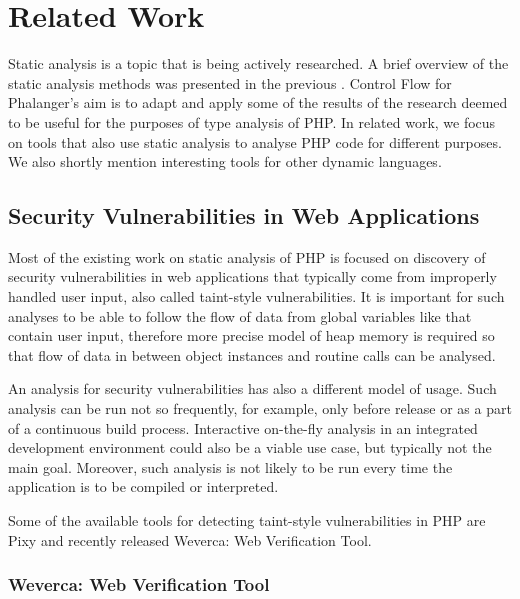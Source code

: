 \chapter{Related Work}

    Static analysis is a topic that is being actively researched. 
    A brief overview of the static analysis methods was presented 
    in the previous \wchapter{}. Control Flow for Phalanger's aim is 
    to adapt and apply some of the results of the research deemed 
    to be useful for the purposes of type analysis of PHP. 
    In related work, we focus on tools that also use static 
    analysis to analyse PHP code for different purposes. 
    We also shortly mention interesting tools for other 
    dynamic languages.

    \section{Security Vulnerabilities in Web Applications}
    
    Most of the existing work on static analysis of PHP is 
    focused on discovery of security vulnerabilities in 
    web applications that typically come from improperly 
    handled user input, also called taint-style vulnerabilities. 
    It is important for such analyses to be able to follow 
    the flow of data from global variables like  
    that contain user input, therefore more precise model of 
    heap memory is required so that flow of data in between 
    object instances and routine calls can be analysed. 
    
    An analysis for security vulnerabilities has also a different 
    model of usage. Such analysis can be run not so frequently, 
    for example, only before release or as a part of a continuous 
    build process. Interactive on-the-fly analysis in an 
    integrated development environment could also be a viable 
    use case, but typically not the main goal. Moreover, 
    such analysis is not likely to be run every time the 
    application is to be compiled or interpreted.
    
    Some of the available tools for detecting taint-style 
    vulnerabilities in PHP are Pixy\cite{jovanovic2006pixy} 
    and recently released Weverca: Web Verification Tool\cite{hauzarhunting}.    
    
    \subsection{Weverca: Web Verification Tool}
    

